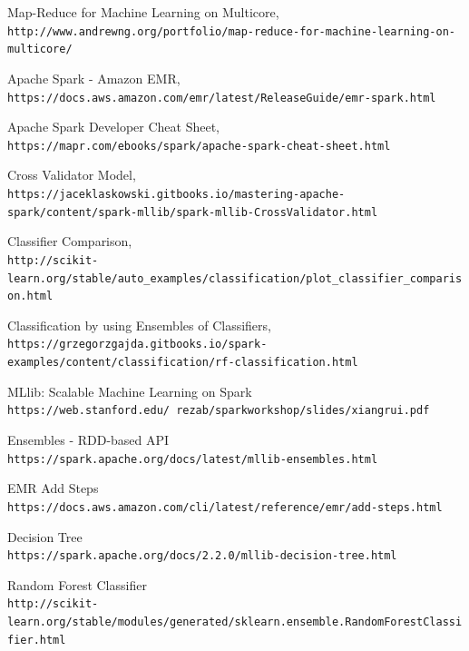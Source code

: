 \documentclass{neu_handout}
\begin{document}
\begin{thebibliography}{9}

Map-Reduce for Machine Learning on Multicore,
\\\texttt{http://www.andrewng.org/portfolio/map-reduce-for-machine-learning-on-multicore/}

Apache Spark - Amazon EMR,
\\\texttt{https://docs.aws.amazon.com/emr/latest/ReleaseGuide/emr-spark.html}

Apache Spark Developer Cheat Sheet,
\\\texttt{https://mapr.com/ebooks/spark/apache-spark-cheat-sheet.html}

Cross Validator Model,
\\\texttt{https://jaceklaskowski.gitbooks.io/mastering-apache-spark/content/spark-mllib/spark-mllib-CrossValidator.html}

Classifier Comparison,
\\\texttt{http://scikit-learn.org/stable/auto\_examples/classification/plot\_classifier\_comparison.html}

Classification by using Ensembles of Classifiers,
\\\texttt{https://grzegorzgajda.gitbooks.io/spark-examples/content/classification/rf-classification.html}


MLlib: Scalable Machine Learning on Spark
\\\texttt{https://web.stanford.edu/~rezab/sparkworkshop/slides/xiangrui.pdf}


Ensembles - RDD-based API
\\\texttt{https://spark.apache.org/docs/latest/mllib-ensembles.html}

EMR Add Steps
\\\texttt{https://docs.aws.amazon.com/cli/latest/reference/emr/add-steps.html}

Decision Tree
\\\texttt{https://spark.apache.org/docs/2.2.0/mllib-decision-tree.html}

Random Forest Classifier
\\\texttt{http://scikit-learn.org/stable/modules/generated/sklearn.ensemble.RandomForestClassifier.html}

\end{thebibliography}
\end{document}
